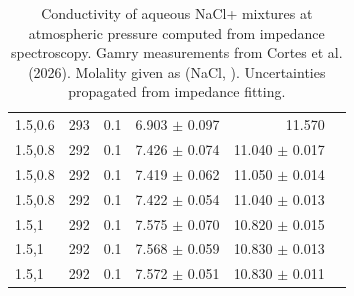 \begin{table}[ht]
\begin{tabular}{lrrrrr}
1.5,0.6 & 293 & 0.1 & 6.903 $\pm$ 0.097 & 11.570 \\
1.5,0.8 & 292 & 0.1 & 7.426 $\pm$ 0.074 & 11.040 $\pm$ 0.017 \\
1.5,0.8 & 292 & 0.1 & 7.419 $\pm$ 0.062 & 11.050 $\pm$ 0.014 \\
1.5,0.8 & 292 & 0.1 & 7.422 $\pm$ 0.054 & 11.040 $\pm$ 0.013 \\
1.5,1 & 292 & 0.1 & 7.575 $\pm$ 0.070 & 10.820 $\pm$ 0.015 \\
1.5,1 & 292 & 0.1 & 7.568 $\pm$ 0.059 & 10.830 $\pm$ 0.013 \\
1.5,1 & 292 & 0.1 & 7.572 $\pm$ 0.051 & 10.830 $\pm$ 0.011 \\
\hline
\end{tabular}
\caption{Conductivity of aqueous NaCl+ mixtures at atmospheric pressure computed from impedance spectroscopy. Gamry measurements from Cortes et al. (2026). Molality given as (NaCl, ). Uncertainties propagated from impedance fitting.}
\label{tab:MixtureCortes}
\end{table}
